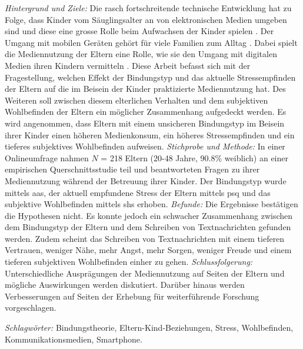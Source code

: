 \begin{flushleft}
\textit{Hintergrund und Ziele:} Die rasch fortschreitende technische Entwicklung hat zu Folge, dass Kinder vom Säuglingsalter an von elektronischen Medien umgeben sind und diese eine grosse Rolle beim Aufwachsen der Kinder spielen \cite{Feierabend2015}. Der Umgang mit mobilen Geräten gehört für viele Familien zum Alltag \cite{Wagner2016}. Dabei spielt die Mediennutzung der Eltern eine Rolle, wie sie den Umgang mit digitalen Medien ihren Kindern vermitteln \cite{Livingstone2015a}. Diese Arbeit befasst sich mit der Fragestellung, welchen Effekt der Bindungstyp und das aktuelle Stressempfinden der Eltern auf die im Beisein der Kinder praktizierte Mediennutzung hat. Des Weiteren soll zwischen diesem elterlichen Verhalten und dem subjektiven Wohlbefinden der Eltern ein möglicher Zusammenhang aufgedeckt werden. Es wird angenommen, dass Eltern mit einem unsicheren Bindungstyp im Beisein ihrer Kinder einen höheren Medienkonsum, ein höheres Stressempfinden und ein tieferes subjektives Wohlbefinden aufweisen. \textit{Stichprobe und Methode:} In einer Online\-umfrage nahmen $N$ = 218 Eltern (20-48 Jahre, 90.8\% weiblich) an einer empirischen Querschnittsstudie teil und beantworteten Fragen zu ihrer Mediennutzung während der Betreuung ihrer Kinder. Der Bindungstyp wurde mittels \acrfull{aas}, der aktuell empfundene Stress der Eltern mittels \acrfull{psq} und das subjektive Wohlbefinden mittels \acrfull{shs} erhoben. 
\textit{Befunde:} Die Ergebnisse bestätigen die Hypothesen nicht. Es konnte jedoch ein schwacher Zusammenhang zwischen dem Bindungstyp der Eltern und dem Schreiben von Textnachrichten gefunden werden. Zudem scheint das Schreiben von Textnachrichten mit einem tieferen Vertrauen, weniger Nähe, mehr Angst, mehr Sorgen, weniger Freude und einem tieferen subjektiven Wohlbefinden einher zu gehen. 
\textit{Schlussfolgerung:} Unterschiedliche Ausprägungen der Mediennutzung auf Seiten der Eltern und mögliche Auswirkungen werden diskutiert. Darüber hinaus werden Verbesserungen auf Seiten der Erhebung für weiterführende Forschung vorgeschlagen. \linebreak


\textit{Schlagwörter:} Bindungstheorie, Eltern-Kind-Beziehungen, Stress, Wohlbefinden, Kommunikationsmedien, Smartphone.

\end{flushleft}
